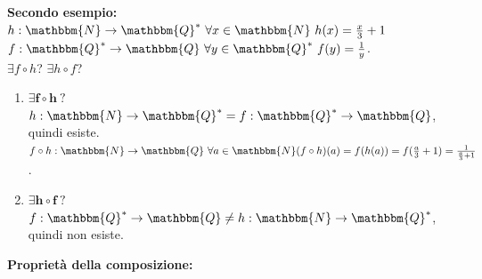 \documentclass[12pt, letterpaper]{report}
\begin{document}
	\textbf{Secondo esempio: }
	\\
	$h: \mathbbm{N} \to \mathbbm{Q}^* \ \forall x \in \mathbbm{N} \ h(x) = \frac{x}{3} + 1$
	\\
	$f: \mathbbm{Q}^* \to \mathbbm{Q} \ \forall y \in \mathbbm{Q}^* \ f(y) = \frac{1}{y}$.
	\\
	$\exists f \circ h$? $\exists h \circ f$?
	\begin{enumerate}
		\item $\mathbf{\exists f \circ h \ ?}$ \\ $h: \mathbbm{N} \to \mathbbm{Q}^*= f: \mathbbm{Q}^* \to \mathbbm{Q}$, quindi esiste.
		\\
			$f \circ h: \mathbbm{N} \to \mathbbm{Q} \ \forall a \in \mathbbm{N} \\ (f \circ h)(a) = f(h(a)) = f(\frac{a}{3} + 1) = \frac{1}{\frac{a}{3} + 1}$.
		\item $\mathbf{\exists h \circ f \ ?}$ \\ $f: \mathbbm{Q}^* \to \mathbbm{Q} \neq h: \mathbbm{N} \to \mathbbm{Q}^*$, quindi non esiste.
	\end{enumerate}
	\textbf{Proprietà della composizione: }
\end{document}
